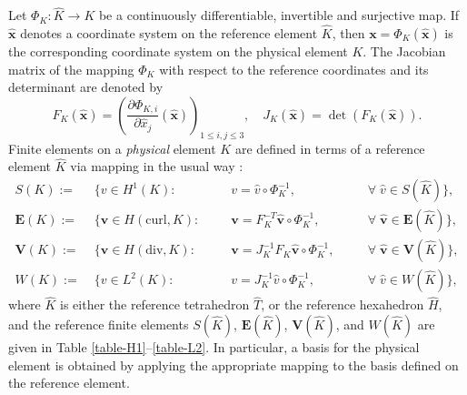\documentclass[twoside,reqno,final]{amsart}
\renewcommand{\b}[1]{{\boldsymbol{#1}}}
\newcommand{\bld}[1]{\boldsymbol{#1}}
\begin{document}
Let $\Phi_K:\widehat K\rightarrow K$ be a continuously differentiable, invertible and surjective map. 
If $\widehat{\bld {x}}$ denotes a coordinate system on the reference element $\widehat K$, then 
$\bld x = \Phi_K(\widehat{\bld {x}})$ is the corresponding coordinate system on the physical element $K$.
The
Jacobian matrix of the mapping $\Phi_K$ with respect to the reference coordinates and its determinant 
are denoted by
\[
 F_K(\widehat{\b x}) = \left(\frac{\partial\Phi_{K,i}}{\partial \hat x_j}(\widehat {\b x})\right)_{1\le i,j\le 3},\quad
 J_K(\widehat{\b x}) = \det (F_K(\widehat{\b x})).
\]
Finite elements on a {\it physical} element $K$ are defined in terms of  a reference element $\widehat K$ 
via mapping in the usual way \cite{Monk03}:
\begin{subequations}
\label{space-mapping}
\begin{alignat}{4}
\label{space-mapping-1}
 S(K) :=&\; \{ v\in H^1(K):\;
&& \;\; v = \widehat v\circ \Phi_K^{-1}, \quad &&\forall \;\widehat v\in  S(\widehat{K})
 \}, \\
\label{space-mapping-2}
 \b E(K) :=&\; \{\b v\in H(\mathrm{curl},K):\;
&&\;\; \b  v = F_K^{-T}\widehat {\b v}\circ \Phi_K^{-1}, \quad &&\forall\; \widehat{\b v}\in  \b E(\widehat{K})
 \}, \\
\label{space-mapping-3}
\b V(K) :=&\; \{\b v\in H(\mathrm{div}, K):\;
 &&\;\;\b v = J_K^{-1}F_K \widehat {\b v}\circ \Phi_K^{-1}, \quad&&\forall\;  \widehat{\b v}\in \b V(\widehat{K})
 \}, \\
\label{space-mapping-4}
W(K) :=&\; \{ v\in L^2(K):\;
 &&\;\; v = J_K^{-1} \widehat v\circ \Phi_K^{-1}, \quad&&\forall\;  \widehat v\in  W(\widehat{K})
 \},
\end{alignat}
\end{subequations}
where $\widehat K$ is either the reference tetrahedron $\widehat T$, or the 
reference hexahedron $\widehat H$, and
the reference finite elements $S(\widehat{K})$, 
$\b E(\widehat{K})$, $\b V(\widehat{K})$, and $W(\widehat{K})$
are given in Table \ref{table-H1}--\ref{table-L2}.
In particular, 
a basis for the physical element is obtained by applying the appropriate mapping to the basis defined on the reference element.
\end{document}
